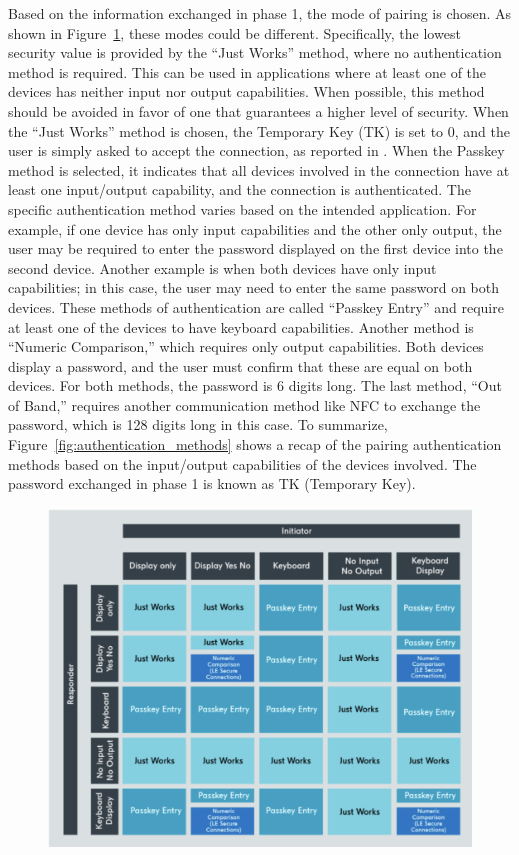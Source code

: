 \documentclass{Configuration_Files/PoliMi3i_thesis}
\begin{document}
Based on the information exchanged in phase 1, the mode of pairing is chosen. As shown in Figure~\ref{fig:pairing_procedure}, these modes could be different. Specifically, the lowest security value is provided by the “Just Works” method, where no authentication method is required. This can be used in applications where at least one of the devices has neither input nor output capabilities. When possible, this method should be avoided in favor of one that guarantees a higher level of security. When the “Just Works” method is chosen, the Temporary Key (TK) is set to 0, and the user is simply asked to accept the connection, as reported in \cite{nordic_academy}. When the Passkey method is selected, it indicates that all devices involved in the connection have at least one input/output capability, and the connection is authenticated. The specific authentication method varies based on the intended application. For example, if one device has only input capabilities and the other only output, the user may be required to enter the password displayed on the first device into the second device. Another example is when both devices have only input capabilities; in this case, the user may need to enter the same password on both devices. These methods of authentication are called “Passkey Entry” and require at least one of the devices to have keyboard capabilities. Another method is “Numeric Comparison,” which requires only output capabilities. Both devices display a password, and the user must confirm that these are equal on both devices. For both methods, the password is 6 digits long. The last method, “Out of Band,” requires another communication method like NFC to exchange the password, which is 128 digits long in this case. To summarize, Figure~\ref{fig:authentication_methods} shows a recap of the pairing authentication methods based on the input/output capabilities of the devices involved. The password exchanged in phase 1 is known as TK (Temporary Key).

\begin{figure}[H]
    \centering
    \includegraphics[scale=0.7]{Bluetooth_Security/3.png}
    \label{fig:pairing_procedure}
\end{figure}
\end{document}
